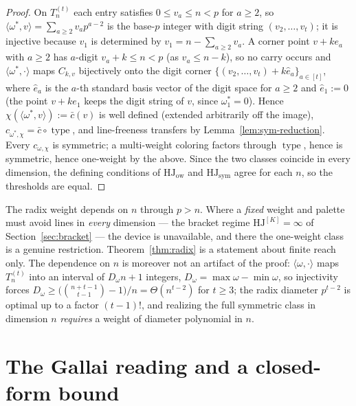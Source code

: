 \documentclass[12pt]{article}
\newcommand{\HJ}{\mathrm{HJ}}
\DeclareMathOperator{\type}{type}
\begin{document}
\begin{proof}
On $T_{n}^{(t)}$ each entry satisfies $0\le v_{a}\le n<p$ for $a\ge 2$,
so $\langle\omega^{\ast},v\rangle=\sum_{a\ge 2}v_{a}p^{a-2}$ is the
base-$p$ integer with digit string $(v_{2},\dots,v_{t})$; it is
injective because $v_{1}$ is determined by
$v_{1}=n-\sum_{a\ge 2}v_{a}$. A corner point $v+ke_{a}$ with $a\ge 2$
has $a$-digit $v_{a}+k\le n<p$ (as $v_{a}\le n-k$), so no carry occurs
and $\langle\omega^{\ast},\cdot\rangle$ maps $C_{k,v}$ bijectively onto
the digit corner $\{(v_{2},\dots,v_{t})+k\hat e_{a}\}_{a\in[t]}$, where
$\hat e_{a}$ is the $a$-th standard basis vector of the digit space for
$a\ge 2$ and $\hat e_{1}:=0$ (the point $v+ke_{1}$ keeps the digit
string of $v$, since $\omega^{\ast}_{1}=0$). Hence
$\chi(\langle\omega^{\ast},v\rangle):=\bar c(v)$ is well defined
(extended arbitrarily off the image),
$c_{\omega^{\ast},\chi}=\bar c\circ\type$, and line-freeness transfers
by Lemma~\ref{lem:sym-reduction}. Every $c_{\omega,\chi}$ is symmetric;
a multi-weight coloring factors through $\type$, hence is symmetric,
hence one-weight by the above. Since the two classes coincide in every
dimension, the defining conditions of $\HJ_{\mathrm{ow}}$ and
$\HJ_{\mathrm{sym}}$ agree for each $n$, so the thresholds are equal.
\end{proof}

\begin{remark}\label{rem:caveat}
The radix weight depends on $n$ through $p>n$. Where a \emph{fixed}
weight and palette must avoid lines in \emph{every} dimension --- the
bracket regime $\HJ^{[K]}=\infty$ of Section~\ref{sec:bracket} --- the
device is unavailable, and there the one-weight class is a genuine
restriction. Theorem~\ref{thm:radix} is a statement about finite reach
only. The dependence on $n$ is moreover not an artifact of the proof:
$\langle\omega,\cdot\rangle$ maps $T_{n}^{(t)}$ into an interval of
$D_{\omega}n+1$ integers, $D_{\omega}=\max\omega-\min\omega$, so
injectivity forces
$D_{\omega}\ge\bigl(\binom{n+t-1}{t-1}-1\bigr)/n=\Theta(n^{t-2})$ for
$t\ge 3$; the radix diameter $p^{t-2}$ is optimal up to a factor
$(t-1)!$, and realizing the full symmetric class in dimension $n$
\emph{requires} a weight of diameter polynomial in $n$.
\end{remark}

\section{The Gallai reading and a closed-form bound}\label{sec:gallai}
\end{document}
